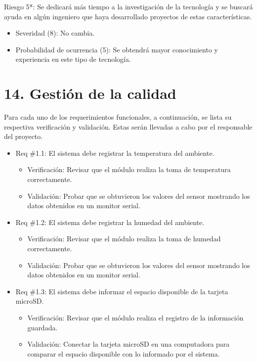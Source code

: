 \documentclass[
11pt, %
]{charter}
\begin{document}
Riesgo 5*: Se dedicará más tiempo a la investigación de la tecnología y se buscará ayuda en algún ingeniero que haya desarrollado proyectos de estas características.
  \begin{itemize}
	\item Severidad (8): No cambia.
	\item Probabilidad de ocurrencia (5): Se obtendrá mayor conocimiento y experiencia en este tipo de tecnología.
	\end{itemize}


\section{14. Gestión de la calidad}
\label{sec:calidad}

Para cada uno de los requerimientos funcionales, a continuación, se lista su respectiva verificación y validación. Estas serán llevadas a cabo por el responsable del proyecto.

\begin{itemize} 
\item Req \#1.1: El sistema debe registrar la temperatura del ambiente.
\begin{itemize}
	\item Verificación: Revisar que el módulo realiza la toma de temperatura correctamente.
	\item Validación: Probar que se obtuvieron los valores del sensor mostrando los datos obtenidos en un monitor serial.
\end{itemize}
\end{itemize}

\begin{itemize} 
\item Req \#1.2: El sistema debe registrar la humedad del ambiente.
\begin{itemize}
	\item Verificación: Revisar que el módulo realiza la toma de humedad correctamente.
	\item Validación: Probar que se obtuvieron los valores del sensor mostrando los datos obtenidos en un monitor serial.
\end{itemize}
\end{itemize}

\begin{itemize} 
\item Req \#1.3: El sistema debe informar el espacio disponible de la tarjeta microSD.
\begin{itemize}
	\item Verificación: Revisar que el módulo realiza el registro de la información guardada.
	\item Validación: Conectar la tarjeta microSD en una computadora para comparar el espacio disponible con lo informado por el sistema.
\end{itemize}
\end{itemize}
\end{document}
